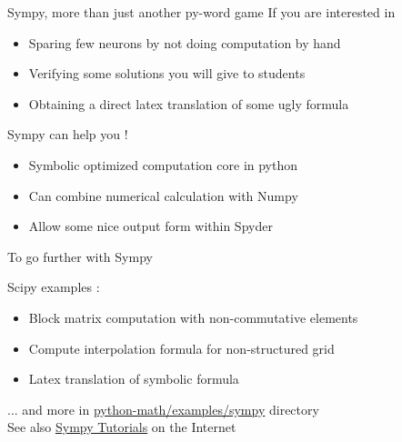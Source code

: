 \documentclass[11pt,unknownkeysallowed,usenames,dvipsnames]{beamer}
\begin{document}
\begin{frame}{Sympy, more than just another py-word game}
    If you are interested in
    \begin{itemize}
        \item Sparing few neurons by not doing computation by hand
        \item Verifying some solutions you will give to students
        \item Obtaining a direct latex translation of some ugly formula 
    \end{itemize}
    \begin{center}
        Sympy can help you !
    \end{center}
    \begin{itemize}
        \item Symbolic optimized computation core in python
        \item Can combine numerical calculation with Numpy
        \item Allow some nice output form within Spyder
    \end{itemize}
\end{frame}

\begin{frame}{To go further with Sympy}
	\begin{block}{Scipy examples :}
        \begin{itemize}
            \item Block matrix computation with non-commutative elements
            \item Compute interpolation formula for non-structured grid
            \item Latex translation of symbolic formula
        \end{itemize}
    \end{block}
    \vspace*{-7pt}
    ... and more in    
    \href{https://gitlab.unige.ch/Thibaut.Lunet/python-math/tree/master/examples/sympy}{python-math/examples/sympy} directory \\
    See also \href{http://docs.sympy.org/latest/tutorial/index.html}{Sympy Tutorials} on the Internet
\end{frame}
\end{document}
